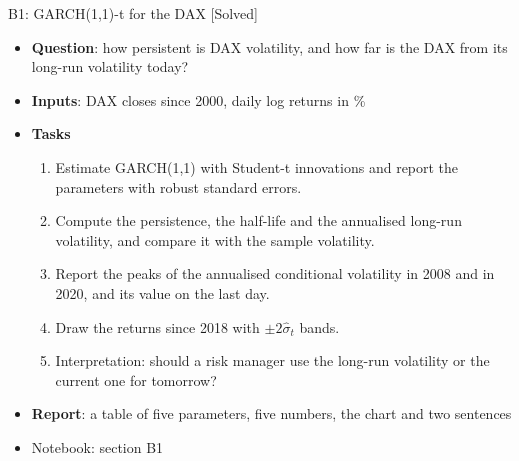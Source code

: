 \begin{frame}{B1: GARCH(1,1)-t for the DAX [Solved]}
\itemsize{\footnotesize}
\begin{itemize}
\item \textbf{Question}: how persistent is DAX volatility, and how far is the DAX from its long-run volatility today?
\item \textbf{Inputs}: DAX closes since 2000, daily log returns in \%
\item \textbf{Tasks}
\begin{enumerate}
    \item Estimate GARCH(1,1) with Student-t innovations and report the parameters with robust standard errors.
    \item Compute the persistence, the half-life and the annualised long-run volatility, and compare it with the sample volatility.
    \item Report the peaks of the annualised conditional volatility in 2008 and in 2020, and its value on the last day.
    \item Draw the returns since 2018 with $\pm 2\hat\sigma_t$ bands.
    \item Interpretation: should a risk manager use the long-run volatility or the current one for tomorrow?
\end{enumerate}
\item \textbf{Report}: a table of five parameters, five numbers, the chart and two sentences
\item Notebook: section B1
\end{itemize}
\end{frame}

